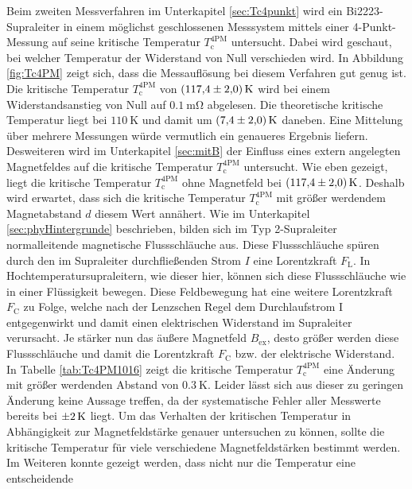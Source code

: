 Beim zweiten Messverfahren im Unterkapitel \ref{sec:Tc4punkt} wird ein
Bi2223-Supraleiter in einem möglichst geschlossenen Messsystem mittels einer
4-Punkt-Messung auf seine kritische Temperatur $T^{\text{4PM}}_{\text{c}}$
untersucht. Dabei wird geschaut, bei welcher Temperatur der Widerstand von Null
verschieden wird. In Abbildung \ref{fig:Tc4PM} zeigt sich, dass die Messauflösung
bei diesem Verfahren gut genug ist. Die kritische Temperatur $T^{\text{4PM}}_{\text{c}}$ von
$\SI{117,4\pm2}{\kelvin}$ wird bei einem Widerstandsanstieg von Null auf $\SI{0.1}{\milli\ohm}$
abgelesen. Die theoretische kritische Temperatur liegt bei $\SI{110}{\kelvin}$
\cite[S. 64]{Hohenester} und damit um $\SI{7,4\pm2}{\kelvin}$ daneben. Eine Mittelung
über mehrere Messungen würde vermutlich ein genaueres Ergebnis liefern.\\
Desweiteren wird im Unterkapitel \ref{sec:mitB} der Einfluss eines extern
angelegten Magnetfeldes auf die kritische Temperatur $T^{\text{4PM}}_{\text{c}}$ untersucht.
Wie eben gezeigt, liegt die kritische Temperatur $T^{\text{4PM}}_{\text{c}}$ ohne
Magnetfeld bei $\SI{117,4\pm2}{\kelvin}$. Deshalb wird erwartet, dass sich
die kritische Temperatur $T^{\text{4PM}}_{\text{c}}$ mit größer werdendem Magnetabstand
$d$ diesem Wert annähert. Wie im Unterkapitel \ref{sec:phyHintergrunde} beschrieben,
bilden sich im Typ 2-Supraleiter normalleitende magnetische Flussschläuche aus. Diese
Flussschläuche spüren durch den im Supraleiter durchfließenden Strom $I$
eine Lorentzkraft $F_{\text{L}}$. In Hochtemperatursupraleitern, wie dieser hier,
können sich diese Flussschläuche wie in einer Flüssigkeit bewegen.
Diese Feldbewegung hat eine weitere Lorentzkraft $F_{\text{C}}$ zu Folge, welche
nach der Lenzschen Regel dem Durchlaufstrom I entgegenwirkt und damit einen
elektrischen Widerstand im Supraleiter verursacht. Je stärker nun das äußere
Magnetfeld $B_{\text{ex}}$, desto größer werden diese Flussschläuche und damit
die Lorentzkraft $F_{\text{C}}$ bzw. der elektrische Widerstand.
In Tabelle \ref{tab:Tc4PM1016} zeigt die kritische Temperatur
$T^{\text{4PM}}_{\text{c}}$ eine Änderung mit größer werdenden Abstand von
$\SI{0.3}{\kelvin}$. Leider lässt sich aus dieser zu geringen Änderung keine
Aussage treffen, da der systematische Fehler aller Messwerte bereits bei
$\SI{\pm2}{\kelvin}$ liegt. Um das Verhalten der kritischen Temperatur in
Abhängigkeit zur Magnetfeldstärke genauer untersuchen zu können, sollte die
kritische Temperatur für viele verschiedene Magnetfeldstärken bestimmt werden.\\
Im Weiteren konnte gezeigt werden, dass nicht nur die Temperatur eine entscheidende
